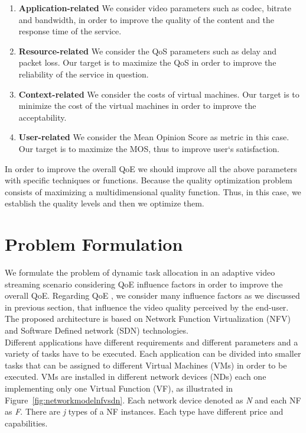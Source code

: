\documentclass[a4paper]{article}
\begin{document}
\begin{enumerate}
\item \textbf{Application-related} 
We consider video parameters such as codec, bitrate and bandwidth, in order to improve the quality of the content and the response time of the service. \\

\item \textbf{Resource-related} 
We consider the QoS parameters such as delay and packet loss. Our target is to maximize the QoS in order to improve the reliability of the service in question. \\

\item \textbf{Context-related} 
We consider the costs of virtual machines. Our target is to minimize the cost of the virtual machines in order to improve the acceptability. \\
\item  \textbf{User-related} 
We consider the Mean Opinion Score as metric in this case. Our target is to maximize the MOS, thus to improve user`s satisfaction.\\

\end{enumerate}
In order to improve the overall QoE we should improve all the above parameters with specific techniques or functions. Because the quality optimization problem consists of maximizing a multidimensional quality function. Thus, in this case, we establish the quality levels and then we optimize them. 

\section{Problem Formulation}
We formulate the problem of dynamic task allocation in an adaptive video streaming scenario considering QoE influence factors in order to improve the overall QoE. Regarding QoE , we consider many influence factors as we discussed in previous section, that influence the video quality perceived by the end-user.  The proposed architecture is based on Network Function Virtualization (NFV) and Software Defined network (SDN) technologies. \\

Different applications have different requirements and different parameters and a variety of tasks have to be executed. Each application can be divided into smaller tasks that can be assigned to different Virtual Machines (VMs) in order to be executed. VMs are installed in different network devices (NDs) each one implementing only one Virtual Function (VF), as illustrated in Figure~\ref{fig:networkmodelnfvsdn}. Each network device denoted as \textit{N} and each NF as \textit{F}. There are \textit{j} types of a NF instances. Each type have different price and capabilities. \\ 
\end{document}
